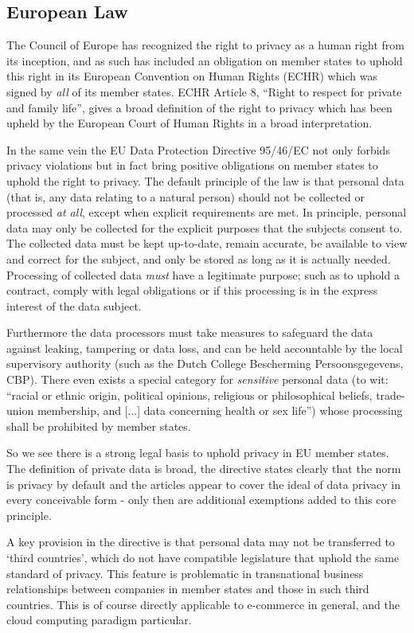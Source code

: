 \documentclass[12pt]{article}
\begin{document}
\subsection{European Law}
The Council of Europe has recognized the right to privacy as a human right from its inception, and as such has included an obligation on member states to uphold this right in its European Convention on Human Rights (ECHR) which was signed by \emph{all} of its member states.
ECHR Article 8, ``Right to respect for private and family life'', gives a broad definition of the right to privacy which has been upheld by the European Court of Human Rights in a broad interpretation.

In the same vein the EU Data Protection Directive 95/46/EC not only forbids privacy violations but in fact bring positive obligations on member states to uphold the right to privacy. \cite{directive199595}
The default principle of the law is that personal data (that is, any data relating to a natural person) should not be collected or processed \textit{at all}, except when explicit requirements are met.
In principle, personal data may only be collected for the explicit purposes that the subjects consent to.
The collected data must be kept up-to-date, remain accurate, be available to view and correct for the subject, and only be stored as long as it is actually needed.
Processing of collected data \emph{must} have a legitimate purpose; such as to uphold a contract, comply with legal obligations or if this processing is in the express interest of the data subject.

Furthermore the data processors must take measures to safeguard the data against leaking, tampering or data loss, and can be held accountable by the local supervisory authority (such as the Dutch College Bescherming Persoonsgegevens, CBP).
There even exists a special category for \textit{sensitive} personal data (to wit: ``racial or ethnic origin, political opinions, religious or philosophical beliefs, trade-union membership, and [...] data concerning health or sex life'') whose processing shall be prohibited by member states.

So we see there is a strong legal basis to uphold privacy in EU member states.
The definition of private data is broad, the directive states clearly that the norm is privacy by default and the articles appear to cover the ideal of data privacy in every conceivable form - only then are additional exemptions added to this core principle.

A key provision in the directive is that personal data may not be transferred to `third countries', which do not have compatible legislature that uphold the same standard of privacy.
This feature is problematic in transnational business relationships between companies in member states and those in such third countries.
This is of course directly applicable to e-commerce in general, and the cloud computing paradigm particular.
\end{document}
